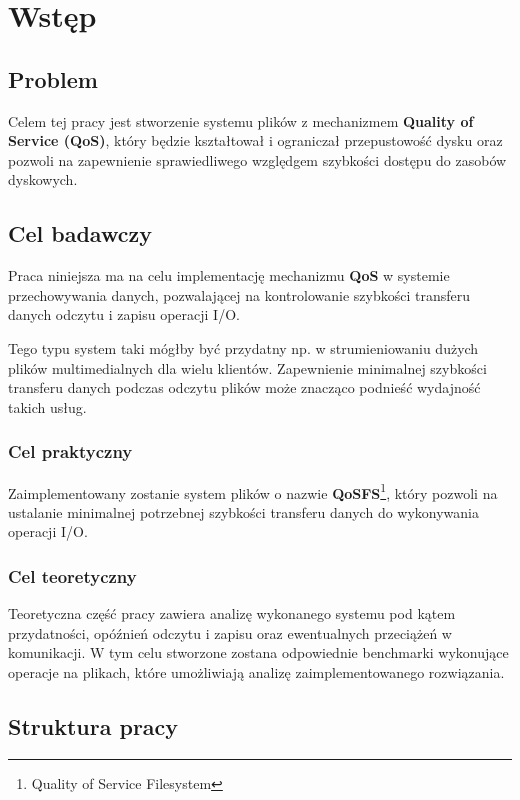 \chapter{Wstęp} \label{ch:introduction}

\section{Problem}

Celem tej pracy jest stworzenie systemu plików z mechanizmem
\textbf{Quality of Service (QoS)}, który będzie kształtował i ograniczał przepustowość dysku oraz pozwoli na zapewnienie sprawiedliwego względgem szybkości
dostępu do zasobów dyskowych.

\section{Cel badawczy}

Praca niniejsza ma na celu implementację mechanizmu \textbf{QoS} w systemie przechowywania danych,
pozwalającej na kontrolowanie szybkości transferu danych odczytu i zapisu operacji I/O.

Tego typu system taki mógłby być przydatny np. w strumieniowaniu dużych plików multimedialnych dla wielu klientów.
Zapewnienie minimalnej szybkości transferu danych podczas odczytu plików może znacząco podnieść wydajność
takich usług.

\subsection{Cel praktyczny}
Zaimplementowany zostanie system plików o nazwie \textbf{QoSFS}\footnote{Quality of Service Filesystem}, który pozwoli na ustalanie minimalnej potrzebnej szybkości transferu danych do wykonywania operacji I/O.

\subsection{Cel teoretyczny}
Teoretyczna część pracy zawiera analizę wykonanego systemu pod kątem przydatności,
opóźnień odczytu i zapisu oraz ewentualnych przeciążeń w komunikacji.
W tym celu stworzone zostana odpowiednie benchmarki wykonujące operacje na plikach,
które umożliwiają analizę zaimplementowanego rozwiązania.

\section{Struktura pracy}

